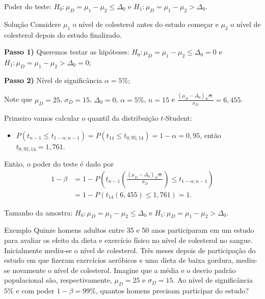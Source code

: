 \documentclass[9pt]{beamer}
\begin{document}
\begin{frame}{Poder do teste: $H_0:\mu_D = \mu_1 - \mu_2 \leq \Delta_0$ e $H_1:\mu_D =  \mu_1 - \mu_2 > \Delta_0$.}

\begin{block}{Solução}
	Considere $\mu_1$ o nível de colesterol antes do estudo começar e $\mu_2$ o nível de colesterol depois do estudo finalizado.
	
	\textbf{Passo 1)} Queremos testar as hipóteses: $H_0: \mu_D = \mu_1 - \mu_2 \leq \Delta_0=0$ e $H_1:\mu_D = \mu_1 - \mu_2 > \Delta_0 = 0$;
	
	\textbf{Passo 2)} Nível de significância $\alpha=5\%$;
	
	Note que $\mu_D = 25$, $\sigma_D = 15$, $\Delta_0 = 0$, $\alpha=5\%$, $n=15$ e $\frac{(\mu_D - \Delta_0)\sqrt{n}}{\sigma_D} = 6,455$.
	
	Primeiro vamos calcular o quantil da distribuição $t$-Student:
	\begin{itemize}
		\item $P(t_{n-1} \leq t_{1-\alpha; n-1}) = P(t_{14} \leq t_{0,95; 14}) = 1-\alpha = 0,95$, então $t_{0,95; 14} = 1,761$.
	\end{itemize}

	Então, o poder do teste é dado por
	\begin{align*}
	1-\beta &= 1 - P\left( t_{n-1}\left( \frac{(\mu_D - \Delta_0)\sqrt{n}}{\sigma_D} \right) \leq t_{1-\alpha;n-1} \right)\\
	&= 1 - P\left( t_{14}\left(6,455 \right) \leq 1,761 \right)  = 1.
	\end{align*}
\end{block}

\end{frame}

\begin{frame}{Tamanho da amostra: $H_0:\mu_D = \mu_1 - \mu_2 \leq \Delta_0$ e $H_1:\mu_D =  \mu_1 - \mu_2 > \Delta_0$.}

\large
\begin{block}{Exemplo}
	Quinze homens adultos entre 35 e 50 anos participaram em um estudo para avaliar os efeito da dieta e exercício físico no nível de colesterol no sangue. Inicialmente mediu-se o nível de colesterol. Três meses depois de participação do estudo em que fizeram exercícios aeróbicos e uma dieta de baixa gordura,  mediu-se novamente o nível de colesterol. Imagine que a média e o desvio padrão populacional são, respectivamente, $\mu_D = 25$ e $\sigma_D = 15$.  Ao nível de significância $5\%$ e com poder $1-\beta=99\%$, quantos homens precisam participar do estudo?
\end{block}
\normalsize

\end{frame}
\end{document}
